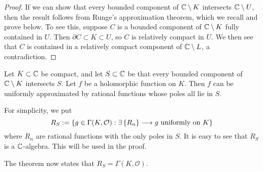 \documentclass{article}
\begin{document}
\begin{proof}
    If we can show that every bounded component of $\mathbb{C}\setminus K$ intersects $\mathbb{C}\setminus U$, then the result follows from Runge's approximation theorem, which we recall and prove below. To see this, suppose $C$ is a bounded component of $\mathbb{C}\setminus K$ fully contained in $U$. Then $\partial C\subset K\subset U$, so $C$ is relatively compact in $U$. We then see that $C$ is contained in a relatively compact component of $\mathbb{C}\setminus L$, a contradiction.
\end{proof}

\begin{theorem}[Runge]
    Let $K\subset\mathbb{C}$ be compact, and let $S\subset\mathbb{C}$ be that every bounded component of $\mathbb{C}\setminus K$ intersects $S$. Let $f$ be a holomorphic function on $K$. Then $f$ can be uniformly approximated by rational functions whose poles all lie in $S$.
\end{theorem}

For simplicity, we put
\[
    R_S := \left\{g\in\Gamma(K,\mathcal{O}):\exists\left\{R_n\right\}\longrightarrow g\text{ uniformly on }K\right\}
\]
where $R_n$ are rational functions with the only poles in $S$. It is easy to see that $R_S$ is a $\mathbb{C}$-algebra. This will be used in the proof.

The theorem now states that $R_S=\Gamma(K,\mathcal{O})$.
\end{document}
